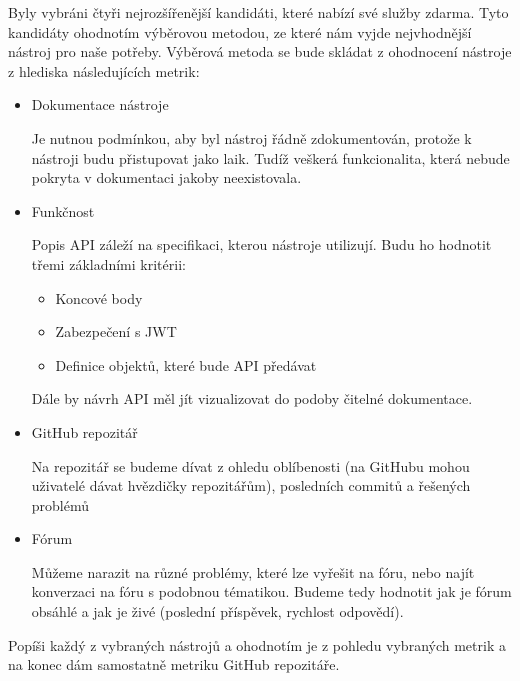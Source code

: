 \documentclass[thesis=B,czech]{FITthesis}[2012/06/26]
\begin{document}
        Byly vybráni čtyři nejrozšířenější kandidáti, které nabízí své služby zdarma. Tyto kandidáty ohodnotím výběrovou metodou, ze které nám vyjde nejvhodnější nástroj pro naše potřeby.
		Výběrová metoda se bude skládat z ohodnocení nástroje z hlediska následujících metrik:
        \begin{itemize}
            \item Dokumentace nástroje
            
            	Je nutnou podmínkou, aby byl nástroj řádně zdokumentován, protože k nástroji budu přistupovat jako laik. Tudíž veškerá funkcionalita, která nebude pokryta v dokumentaci jakoby neexistovala.
            \item Funkčnost
           	
               	Popis API záleží na specifikaci, kterou nástroje utilizují. Budu ho hodnotit třemi základními kritérii:
       	        \begin{itemize}
               	    \item Koncové body
    		        \item Zabezpečení s JWT
    		        \item Definice objektů, které bude API předávat
        		\end{itemize}
    	        Dále by návrh API měl jít vizualizovat do podoby čitelné dokumentace.
            \item GitHub repozitář
            
                Na repozitář se budeme dívat z ohledu oblíbenosti (na GitHubu mohou uživatelé dávat hvězdičky repozitářům), posledních commitů a řešených problémů
            \item Fórum
            
                Můžeme narazit na různé problémy, které lze vyřešit na fóru, nebo najít konverzaci na fóru s podobnou tématikou. Budeme tedy hodnotit jak je fórum obsáhlé a jak je živé (poslední příspěvek, rychlost odpovědí).
        \end{itemize}
        Popíši každý z vybraných nástrojů a ohodnotím je z pohledu vybraných metrik a na konec dám samostatně metriku GitHub repozitáře.
\end{document}
